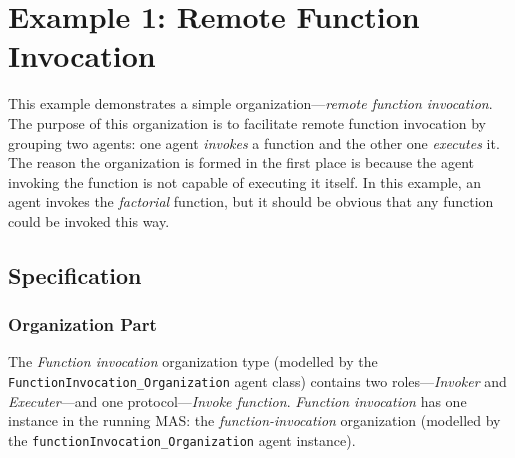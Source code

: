 
\section{Example 1: Remote Function Invocation}

This example demonstrates a simple organization---\textit{remote function invocation}.
The purpose of this organization is to facilitate remote function invocation by grouping two agents: one agent \textit{invokes} a function and the other one \textit{executes} it.
The reason the organization is formed in the first place is because the agent invoking the function is not capable of executing it itself.
In this example, an agent invokes the \textit{factorial} function, but it should be obvious that any function could be invoked this way.

\subsection*{Specification}

\subsubsection*{Organization Part}

The \textit{Function invocation} organization type (modelled by the \texttt{FunctionInvocation\_Organization} agent class) contains two roles---\textit{Invoker} and \textit{Executer}---and one protocol---\textit{Invoke function}.
\textit{Function invocation} has one instance in the running MAS: the \textit{function-invocation} organization (modelled by the \texttt{functionInvocation\_Organization} agent instance).

